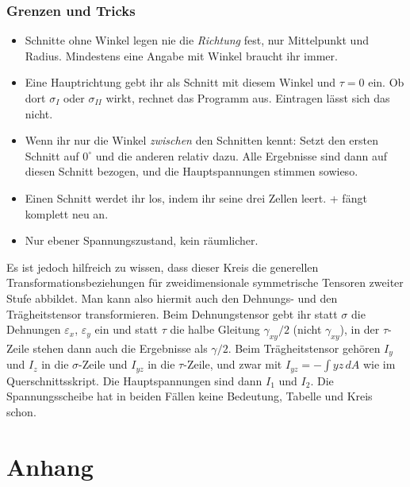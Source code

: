 \section{Grenzen und Tricks}

\begin{itemize}
  \item Schnitte ohne Winkel legen nie die \emph{Richtung} fest, nur Mittelpunkt und Radius.
        Mindestens eine Angabe mit Winkel braucht ihr immer.
  \item Eine Hauptrichtung gebt ihr als Schnitt mit diesem Winkel und $\tau = 0$ ein. Ob dort
        $\sigma_I$ oder $\sigma_{II}$ wirkt, rechnet das Programm aus. Eintragen lässt sich das nicht.
  \item Wenn ihr nur die Winkel \emph{zwischen} den Schnitten kennt: Setzt den ersten Schnitt auf
        $0^\circ$ und die anderen relativ dazu. Alle Ergebnisse sind dann auf diesen Schnitt
        bezogen, und die Hauptspannungen stimmen sowieso.
  \item Einen Schnitt werdet ihr los, indem ihr seine drei Zellen leert. + fängt
        komplett neu an.
  \item Nur ebener Spannungszustand, kein räumlicher.
\end{itemize}

Es ist jedoch hilfreich zu wissen, dass dieser Kreis die generellen Transformationsbeziehungen
für zweidimensionale symmetrische Tensoren zweiter Stufe abbildet. Man kann also hiermit
auch den Dehnungs- und den Trägheitstensor transformieren. Beim Dehnungstensor gebt ihr statt
$\sigma$ die Dehnungen $\varepsilon_x$, $\varepsilon_y$ ein und statt $\tau$ die halbe Gleitung
$\gamma_{xy}/2$ (nicht $\gamma_{xy}$), in der $\tau$-Zeile stehen dann auch die Ergebnisse als
$\gamma/2$. Beim Trägheitstensor gehören $I_y$ und $I_z$ in die $\sigma$-Zeile und $I_{yz}$ in die
$\tau$-Zeile, und zwar mit $I_{yz} = -\int yz\,dA$ wie im Querschnittsskript. Die Hauptspannungen
sind dann $I_1$ und $I_2$. Die Spannungsscheibe hat in beiden Fällen keine Bedeutung, Tabelle
und Kreis schon.




\appendix
\part{Anhang}

